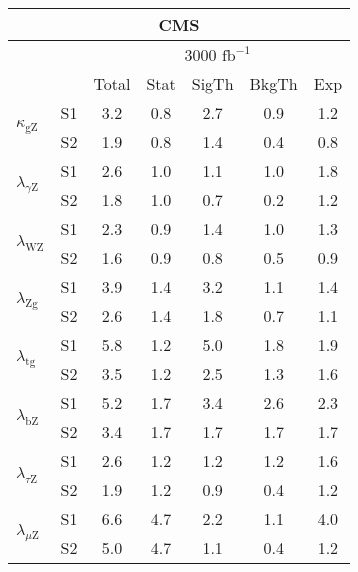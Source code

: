 \begin{tabular}{@{} l c c@{\hskip 0.15in} c c c c @{}}
 \hline
   \multicolumn{7}{c}{CMS}\\
 \hline
  &  & \multicolumn{5}{c}{3000 $\text{fb}^{-1}$} \\
  &  & Total & Stat & SigTh & BkgTh & Exp \\
 \hline
\multirow{2}{*}{$\kappa_{\mathrm{gZ}}$} & S1  & 3.2& 0.8 & 2.7 & 0.9 & 1.2  \\[1pt]
                        & S2  & 1.9& 0.8 & 1.4 & 0.4 & 0.8  \\[4pt]
\multirow{2}{*}{$\lambda_{\gamma\mathrm{Z}}$} & S1  & 2.6& 1.0 & 1.1 & 1.0 & 1.8  \\[1pt]
                        & S2  & 1.8& 1.0 & 0.7 & 0.2 & 1.2  \\[4pt]
\multirow{2}{*}{$\lambda_{\mathrm{WZ}}$} & S1  & 2.3& 0.9 & 1.4 & 1.0 & 1.3  \\[1pt]
                        & S2  & 1.6& 0.9 & 0.8 & 0.5 & 0.9  \\[4pt]
\multirow{2}{*}{$\lambda_{\mathrm{Zg}}$} & S1  & 3.9& 1.4 & 3.2 & 1.1 & 1.4  \\[1pt]
                        & S2  & 2.6& 1.4 & 1.8 & 0.7 & 1.1  \\[4pt]
\multirow{2}{*}{$\lambda_{\mathrm{tg}}$} & S1  & 5.8& 1.2 & 5.0 & 1.8 & 1.9  \\[1pt]
                        & S2  & 3.5& 1.2 & 2.5 & 1.3 & 1.6  \\[4pt]
\multirow{2}{*}{$\lambda_{\mathrm{bZ}}$} & S1  & 5.2& 1.7 & 3.4 & 2.6 & 2.3  \\[1pt]
                        & S2  & 3.4& 1.7 & 1.7 & 1.7 & 1.7  \\[4pt]
\multirow{2}{*}{$\lambda_{\tau\mathrm{Z}}$} & S1  & 2.6& 1.2 & 1.2 & 1.2 & 1.6  \\[1pt]
                        & S2  & 1.9& 1.2 & 0.9 & 0.4 & 1.2  \\[4pt]
\multirow{2}{*}{$\lambda_{\mu\mathrm{Z}}$} & S1  & 6.6& 4.7 & 2.2 & 1.1 & 4.0  \\[1pt]
                        & S2  & 5.0& 4.7 & 1.1 & 0.4 & 1.2  \\[4pt]
\hline
\end{tabular}